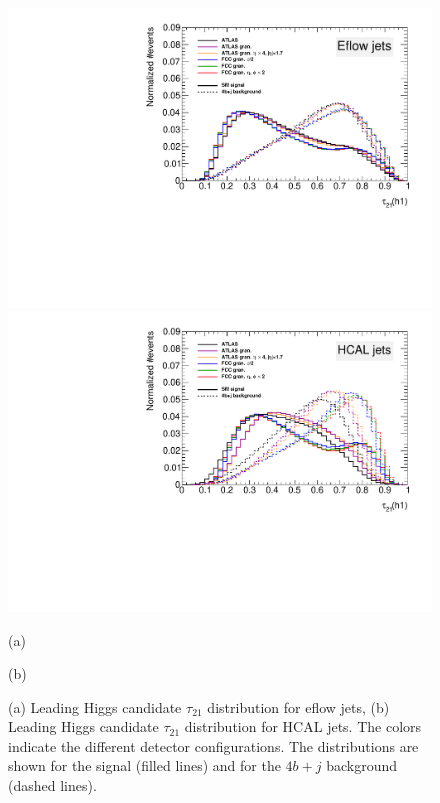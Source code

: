 \begin{figure}
	\centering
	\begin{minipage}[t]{.5\textwidth}
		\centering
		\includegraphics[trim={.65cm 0 0 0},clip,width=\linewidth]{./Figures/tau21.pdf}
	\end{minipage}%
	\begin{minipage}[t]{.5\textwidth}
		\centering
		\includegraphics[trim={0 0 .65cm 0},clip,width=\linewidth]{./Figures/tau21CALO.pdf}
	\end{minipage}
	
	\begin{minipage}[t]{0.5\textwidth}
		\caption*{(a)}
	\end{minipage}%
	\hfill
	\begin{minipage}[t]{0.5\textwidth}
		\caption*{(b)}
	\end{minipage}
	\caption{(a) Leading Higgs candidate $\tau_{21}$ distribution for eflow jets, (b) Leading Higgs candidate $\tau_{21}$ distribution for HCAL jets. The colors indicate the different detector configurations. The distributions are shown for the signal (filled lines) and for the $4b+j$ background (dashed lines).}
	\label{fig:CompGran_sub}
\end{figure}

